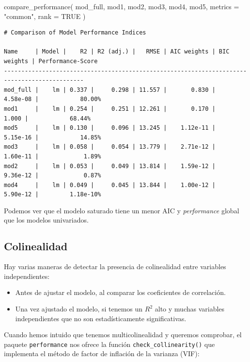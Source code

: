 \documentclass[
  spanish,
  a4paper,
]{scrbook}
\newenvironment{Shaded}{\begin{snugshade}}{\end{snugshade}}
\newcommand{\AttributeTok}[1]{\textcolor[rgb]{0.40,0.45,0.13}{#1}}
\newcommand{\ConstantTok}[1]{\textcolor[rgb]{0.56,0.35,0.01}{#1}}
\newcommand{\FunctionTok}[1]{\textcolor[rgb]{0.28,0.35,0.67}{#1}}
\newcommand{\NormalTok}[1]{\textcolor[rgb]{0.00,0.23,0.31}{#1}}
\newcommand{\StringTok}[1]{\textcolor[rgb]{0.13,0.47,0.30}{#1}}
\begin{document}
\begin{Shaded}
\begin{Highlighting}[]
\FunctionTok{compare\_performance}\NormalTok{(}
\NormalTok{  mod\_full,}
\NormalTok{  mod1,}
\NormalTok{  mod2,}
\NormalTok{  mod3,}
\NormalTok{  mod4,}
\NormalTok{  mod5,}
  \AttributeTok{metrics =} \StringTok{"common"}\NormalTok{,}
  \AttributeTok{rank =} \ConstantTok{TRUE}
\NormalTok{)}
\end{Highlighting}
\end{Shaded}

\begin{verbatim}
# Comparison of Model Performance Indices

Name     | Model |    R2 | R2 (adj.) |   RMSE | AIC weights | BIC weights | Performance-Score
---------------------------------------------------------------------------------------------
mod_full |    lm | 0.337 |     0.298 | 11.557 |       0.830 |    4.58e-08 |            80.00%
mod1     |    lm | 0.254 |     0.251 | 12.261 |       0.170 |       1.000 |            68.44%
mod5     |    lm | 0.130 |     0.096 | 13.245 |    1.12e-11 |    5.15e-16 |            14.85%
mod3     |    lm | 0.058 |     0.054 | 13.779 |    2.71e-12 |    1.60e-11 |             1.89%
mod2     |    lm | 0.053 |     0.049 | 13.814 |    1.59e-12 |    9.36e-12 |             0.87%
mod4     |    lm | 0.049 |     0.045 | 13.844 |    1.00e-12 |    5.90e-12 |         1.18e-10%
\end{verbatim}

Podemos ver que el modelo saturado tiene un menor AIC y
\emph{performance} global que los modelos univariados.

\subsection{Colinealidad}\label{colinealidad-1}

Hay varias maneras de detectar la presencia de colinealidad entre
variables independientes:

\begin{itemize}
\item
  Antes de ajustar el modelo, al comparar los coeficientes de
  correlación.
\item
  Una vez ajustado el modelo, si tenemos un \(R^2\) alto y muchas
  variables independientes que no son estadísticamente significativas.
\end{itemize}

Cuando hemos intuido que tenemos multicolinealidad y queremos comprobar,
el paquete \texttt{performance} nos ofrece la función
\texttt{check\_collinearity()} que implementa el método de factor de
inflación de la varianza (VIF):
\end{document}
